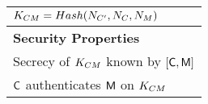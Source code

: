\begin{table}[htb]
\begin{center}
\begin{tabular}{|l|}
            \hspace{5mm} $K_{CM}=Hash(N_{C'},N_{C},N_{M})$                               \\ \hline
            \textbf{Security Properties}                        \\
            \hspace{5mm}Secrecy of $K_{CM}$ known by $[\textsf{C},\textsf{M}]$ \\
            \hspace{5mm} $\textsf{C}$ authenticates $\textsf{M}$ on $K_{CM}$        \\
            \hline \hline            
            \hline 
\end{tabular}
\end{center}
\end{table}
\normalsize
